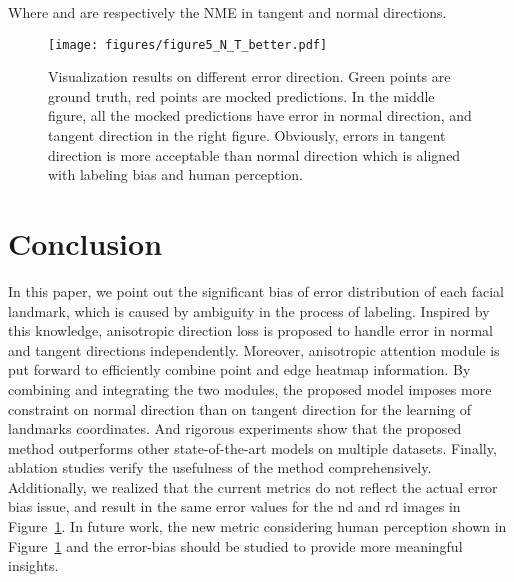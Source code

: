 \documentclass[10pt,twocolumn,letterpaper]{article}
\begin{document}
Where  and  are respectively the NME in tangent and normal directions. 

\begin{figure}
\begin{center}
\texttt{[image: figures/figure5\_N\_T\_better.pdf]}
\end{center}
\vspace{-1.0em}
   \caption{Visualization results on different error direction. Green points are ground truth, red points are mocked predictions. In the middle figure, all the mocked predictions have error in normal direction, and tangent direction in the right figure. Obviously, errors in tangent direction is more acceptable than normal direction which is aligned with labeling bias and human perception.}
\label{figure:N_T_better}
\vspace{-1.0em}
\end{figure}

\section{Conclusion}
\label{section:conclusion}

In this paper, we point out the significant bias of error distribution of each facial landmark, which is caused by ambiguity in the process of labeling.
Inspired by this knowledge, anisotropic direction loss is proposed to handle error in normal and tangent directions independently. Moreover, anisotropic attention module is put forward to efficiently combine point and edge heatmap information. 
By combining and integrating the two modules, the proposed model imposes more constraint on normal direction than on tangent direction for the learning of landmarks coordinates. And rigorous experiments show that the proposed method outperforms other state-of-the-art models on multiple datasets.
Finally, ablation studies verify the usefulness of the method comprehensively.
Additionally, we realized that the current metrics do not reflect the actual error bias issue, and result in the same error values for the nd and rd images in Figure~\ref{figure:N_T_better}.
In future work, the new metric considering human perception shown in Figure~\ref{figure:N_T_better} and the error-bias should be studied to provide more meaningful insights. 

{\small 


}

\clearpage
\appendix
\end{document}
